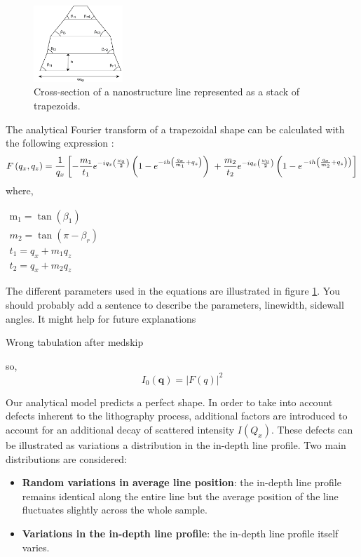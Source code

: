 \begin{figure}[h]
    \centering
    \includegraphics[width=0.3\textwidth]{images/trapezoid.png}
    \caption{Cross-section of a nanostructure line represented as a stack of trapezoids.}
    \label{fig:trapezoid_model}
\end{figure}

The analytical Fourier transform of a trapezoidal shape can be calculated with the following expression \cite{sunday_2015}:
\begin{equation}
    F\left(q_{x}, q_{z}\right)=\frac{1}{q_{x}}\left[-\frac{m_{1}}{t_{1}} e^{-i q_{x}\left(\frac{\omega_{0}}{2}\right)}\left(1-e^{-i h\left(\frac{q_{x}}{m_{1}}+q_{z}\right)}\right)\right. \\ +\frac{m_{2}}{t_{2}} e^{-i q_{x}\left(\frac{\omega_{0}}{2}\right)}\left(1-e^{\left.-i h\left(\frac{q_{x}}{m_{2}}+q_{z}\right)\right)}\right]
    \label{eq:trapezoidal_ft}
\end{equation}
where,

\( \begin{array}{l}\mathrm{m}_{1}=\tan \left(\beta_{1}\right) \\ m_{2}=\tan \left(\pi-\beta_{r}\right) \\ t_{1}= q_{x}+m_{1} q_{z} \\ t_{2}= q_{x}+m_{2} q_{z}\end{array} \)

The different parameters used in the equations are illustrated in figure \ref{fig:trapezoid_model}.
\color{red} You should probably add a sentence to describe the parameters, linewidth, sidewall angles. It might help for future explanations \color{black}

\medskip
\color{red} Wrong tabulation after medskip \color{black}

so,
\begin{equation}
    I_{0}(\mathbf{q}) = |F(q)|^{2}
\end{equation}

Our analytical model predicts a perfect shape. In order to take into account defects inherent to the lithography process, 
additional factors are introduced to account for an additional decay of scattered intensity $I(Q_{x})$.
These defects can be illustrated as variations a distribution in the in-depth line profile. 
Two main distributions are considered:
\begin{itemize}
    \item \textbf{Random variations in average line position}: the in-depth line profile remains identical along the entire line
         but the average position of the line fluctuates slightly across the whole sample.
    \item \textbf{Variations in the in-depth line profile}: the in-depth line profile itself varies.
\end{itemize}

